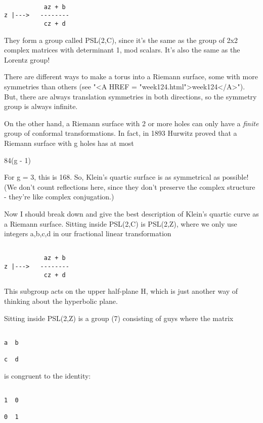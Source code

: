 \begin{verbatim}

           az + b
z |--->   --------
           cz + d
\end{verbatim}
    
They form a group called PSL(2,C), since it's the same as the group of
2x2 complex matrices with determinant 1, mod scalars.  It's also the 
same as the Lorentz group!  

There are different ways to make a torus into a Riemann surface,
some with more symmetries than others (see "<A HREF = "week124.html">week124</A>").  But, there 
are always translation symmetries in both directions, so the symmetry 
group is always infinite. 

On the other hand, a Riemann surface with 2 or more holes can only 
have a \emph{finite} group of conformal transformations.  In fact, in 1893 
Hurwitz proved that a Riemann surface with g holes has at most 

84(g - 1)

For g = 3, this is 168.  So, Klein's quartic surface is as symmetrical 
as possible!  (We don't count reflections here, since they don't 
preserve the complex structure - they're like complex conjugation.)

Now I should break down and give the best description of Klein's
quartic curve as a Riemann surface.  Sitting inside PSL(2,C) is
PSL(2,Z), where we only use integers a,b,c,d in our fractional linear 
transformation


\begin{verbatim}

           az + b
z |--->   --------
           cz + d 
\end{verbatim}
    
This subgroup acts on the upper half-plane H, which is just another
way of thinking about the hyperbolic plane.

Sitting inside PSL(2,Z) is a group \Gamma (7) consisting of guys where 
the matrix 


\begin{verbatim}

a  b

c  d 
\end{verbatim}
    
is congruent to the identity:


\begin{verbatim}

1  0

0  1
\end{verbatim}
    
